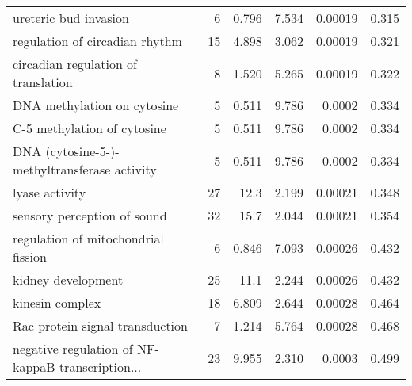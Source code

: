 \begin{longtable}{lrrrrr}
                             ureteric bud invasion &                       6 &                   0.796 &      7.534 &              0.00019 &                0.315 \\
                    regulation of circadian rhythm &                      15 &                   4.898 &      3.062 &              0.00019 &                0.321 \\
               circadian regulation of translation &                       8 &                   1.520 &      5.265 &              0.00019 &                0.322 \\
                       DNA methylation on cytosine &                       5 &                   0.511 &      9.786 &               0.0002 &                0.334 \\
                       C-5 methylation of cytosine &                       5 &                   0.511 &      9.786 &               0.0002 &                0.334 \\
      DNA (cytosine-5-)-methyltransferase activity &                       5 &                   0.511 &      9.786 &               0.0002 &                0.334 \\
                                    lyase activity &                      27 &                    12.3 &      2.199 &              0.00021 &                0.348 \\
                       sensory perception of sound &                      32 &                    15.7 &      2.044 &              0.00021 &                0.354 \\
               regulation of mitochondrial fission &                       6 &                   0.846 &      7.093 &              0.00026 &                0.432 \\
                                kidney development &                      25 &                    11.1 &      2.244 &              0.00026 &                0.432 \\
                                   kinesin complex &                      18 &                   6.809 &      2.644 &              0.00028 &                0.464 \\
                   Rac protein signal transduction &                       7 &                   1.214 &      5.764 &              0.00028 &                0.468 \\
 negative regulation of NF-kappaB transcription... &                      23 &                   9.955 &      2.310 &               0.0003 &                0.499 \\

\end{longtable}
